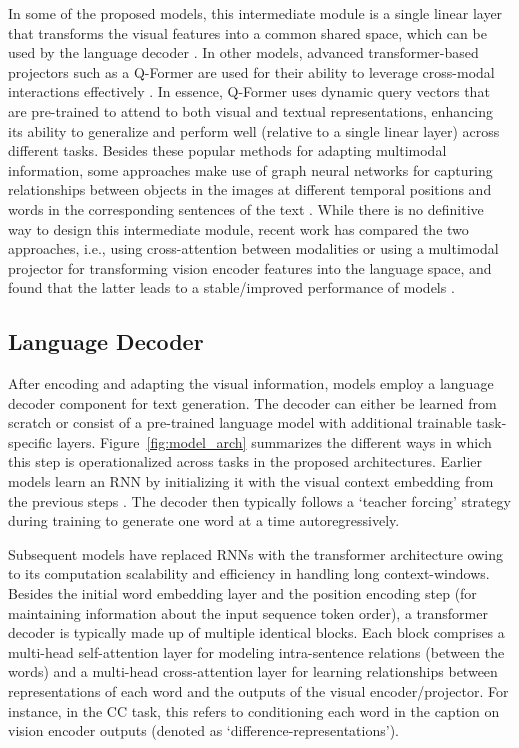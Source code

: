 In some of the proposed models, this intermediate module is a single linear layer that transforms the visual features into a common shared space, which can be used by the language decoder \cite{videoqa_llamavqa,llava}. In other models, advanced transformer-based projectors such as a Q-Former \cite{blip2} are used for their ability to leverage cross-modal interactions effectively \cite{maad3}. In essence, Q-Former uses dynamic query vectors that are pre-trained to attend to both visual and textual representations, enhancing its ability to generalize and perform well (relative to a single linear layer) across different tasks. Besides these popular methods for adapting multimodal information, some approaches make use of graph neural networks for capturing relationships between objects in the images at different temporal positions and words in the corresponding sentences of the text \cite{vc_gnn}. While there is no definitive way to design this intermediate module, recent work has compared the two approaches, i.e., using cross-attention between modalities or using a multimodal projector for transforming vision encoder features into the language space, and found that the latter leads to a stable/improved performance of models \cite{what_matters}.

\subsection{Language Decoder}

After encoding and adapting the visual information, models employ a language decoder component for text generation. The decoder can either be learned from scratch or consist of a pre-trained language model with additional trainable task-specific layers. Figure~\ref{fig:model_arch} summarizes the different ways in which this step is operationalized across tasks in the proposed architectures. Earlier models learn an RNN by initializing it with the visual context embedding from the previous steps \cite{vc_task,vist_glacnet}. The decoder then typically follows a `teacher forcing' strategy during training to generate one word at a time autoregressively.

Subsequent models have replaced RNNs with the transformer architecture owing to its computation scalability and efficiency in handling long context-windows. Besides the initial word embedding layer and the position encoding step (for maintaining information about the input sequence token order), a transformer decoder is typically made up of multiple identical blocks. Each block comprises a multi-head self-attention layer for modeling intra-sentence relations (between the words) and a multi-head cross-attention layer for learning relationships between representations of each word and the outputs of the visual encoder/projector. For instance, in the \color{xkcdVividBlue}CC \color{black} task, this refers to conditioning each word in the caption on vision encoder outputs (denoted as `difference-representations').

